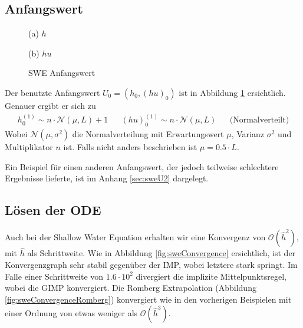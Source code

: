 \subsection{Anfangswert}
\begin{figure}[H]
\footnotesize
\centering
\begin{minipage}[b]{0.49\linewidth}

\caption*{(a) $h$}
\end{minipage}
\begin{minipage}[b]{0.49\linewidth}

\caption*{(b) $hu$}
\end{minipage}
\caption{SWE Anfangswert}
\label{fig:sweInitialValues}
\end{figure}
Der benutzte Anfangswert $U_0 = (h_0,(hu)_0)$ ist in Abbildung \ref{fig:sweInitialValues} ersichtlich. Genauer ergibt er sich zu
\[
\begin{aligned}
 h_0^{(1)} \sim n\cdot\mathcal N(\mu,L) + 1 &&(hu)_0^{(1)}\sim n\cdot\mathcal N(\mu,L) && \text{(Normalverteilt)}
\end{aligned}
\]
Wobei $\mathcal N(\mu, \sigma^2)$ die Normalverteilung mit Erwartungswert $\mu$, Varianz $\sigma^2$ und Multiplikator $n$ ist. Falls nicht anders beschrieben ist $\mu = 0.5\cdot L$.

Ein Beispiel für einen anderen Anfangswert, der jedoch teilweise schlechtere Ergebnisse lieferte, ist im Anhang \ref{sec:sweU2} dargelegt.
\subsection{Lösen der ODE}
Auch bei der Shallow Water Equation erhalten wir eine Konvergenz von $\mathcal O(\hat h^2)$, mit $\hat h$ als Schrittweite. Wie in Abbildung \ref{fig:sweConvergence} ersichtlich, ist der Konvergenzgraph sehr stabil gegenüber der IMP, wobei letztere stark springt.
Im Falle einer Schrittweite von $1.6\cdot 10^2$ divergiert die implizite Mittelpunktsregel, wobei die GIMP konvergiert. 
Die Romberg Extrapolation (Abbildung \ref{fig:sweConvergenceRomberg}) konvergiert wie in den vorherigen Beispielen mit einer Ordnung von etwas weniger als $\mathcal O(\hat h^3)$. 

